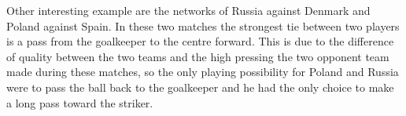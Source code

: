 \documentclass[12pt, a4paper]{article}
\begin{document}
\begin{figure}[H]
        \centering
        \qquad
        \label{fig: spain_pattern}%
\end{figure}

Other interesting example are the networks of Russia against Denmark and Poland against Spain. In these two matches the strongest tie between two players is a pass from the goalkeeper to the centre forward. This is due to the difference of quality between the two teams and the high pressing the two opponent team made during these matches, so the only playing possibility for Poland and Russia were to pass the ball back to the goalkeeper and he had the only choice to make a long pass toward the striker. \\


\begin{figure}[H]
        \centering
        \qquad
        \label{fig:example}%
\end{figure}
\end{document}
